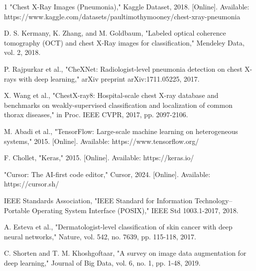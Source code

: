 \documentclass[conference]{IEEEtran}
\begin{document}
\begin{thebibliography}{1}
"Chest X-Ray Images (Pneumonia)," Kaggle Dataset, 2018. [Online]. Available: https://www.kaggle.com/datasets/paultimothymooney/chest-xray-pneumonia

D. S. Kermany, K. Zhang, and M. Goldbaum, "Labeled optical coherence tomography (OCT) and chest X-Ray images for classification," Mendeley Data, vol. 2, 2018.

P. Rajpurkar et al., "CheXNet: Radiologist-level pneumonia detection on chest X-rays with deep learning," arXiv preprint arXiv:1711.05225, 2017.

X. Wang et al., "ChestX-ray8: Hospital-scale chest X-ray database and benchmarks on weakly-supervised classification and localization of common thorax diseases," in Proc. IEEE CVPR, 2017, pp. 2097-2106.

M. Abadi et al., "TensorFlow: Large-scale machine learning on heterogeneous systems," 2015. [Online]. Available: https://www.tensorflow.org/

F. Chollet, "Keras," 2015. [Online]. Available: https://keras.io/

"Cursor: The AI-first code editor," Cursor, 2024. [Online]. Available: https://cursor.sh/

IEEE Standards Association, "IEEE Standard for Information Technology--Portable Operating System Interface (POSIX)," IEEE Std 1003.1-2017, 2018.

A. Esteva et al., "Dermatologist-level classification of skin cancer with deep neural networks," Nature, vol. 542, no. 7639, pp. 115-118, 2017.

C. Shorten and T. M. Khoshgoftaar, "A survey on image data augmentation for deep learning," Journal of Big Data, vol. 6, no. 1, pp. 1-48, 2019.
\end{thebibliography}
\end{document}

